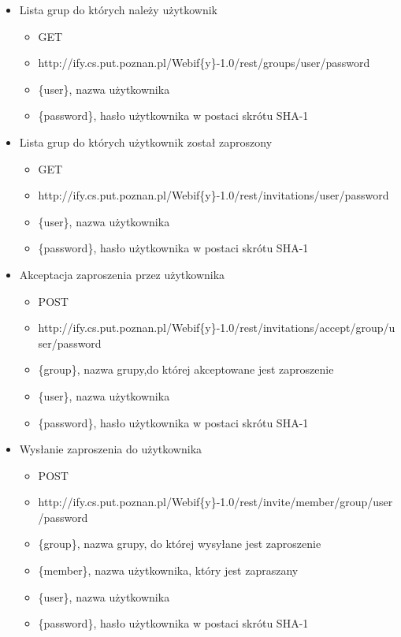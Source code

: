 \documentclass[11pt,a4paper,polish,thesis]{dcsbook}
\begin{document}
\begin{itemize}
	\item Lista grup do których należy użytkownik
	\begin{itemize}
		\item GET
		\item http://ify.cs.put.poznan.pl/Webif\{y\}-1.0/rest/groups/{user}/{password} 
		\item \{user\}, nazwa użytkownika
		\item \{password\}, hasło użytkownika w postaci skrótu SHA-1
	\end{itemize}
	\item Lista grup do których użytkownik został zaproszony
	\begin{itemize}
		\item GET
		\item http://ify.cs.put.poznan.pl/Webif\{y\}-1.0/rest/invitations/{user}/{password}
		\item \{user\}, nazwa użytkownika
		\item \{password\}, hasło użytkownika w postaci skrótu SHA-1
	\end{itemize}
	\item Akceptacja zaproszenia przez użytkownika
	\begin{itemize}
		\item POST
		\item http://ify.cs.put.poznan.pl/Webif\{y\}-1.0/rest/invitations/accept/{group}/{user}/{password}
		\item \{group\}, nazwa grupy,do której akceptowane jest zaproszenie 
		\item \{user\}, nazwa użytkownika
		\item \{password\},  hasło użytkownika w postaci skrótu SHA-1
	\end{itemize}
	\item Wysłanie zaproszenia do użytkownika
	\begin{itemize}
		\item POST
		\item http://ify.cs.put.poznan.pl/Webif\{y\}-1.0/rest/invite/{member}/{group}/{user}/{password}
		\item \{group\}, nazwa grupy, do której wysyłane jest zaproszenie
		\item \{member\}, nazwa użytkownika, który jest zapraszany
		\item \{user\}, nazwa użytkownika
		\item \{password\},  hasło użytkownika w postaci skrótu SHA-1
	\end{itemize}

\end{itemize}
\end{document}

